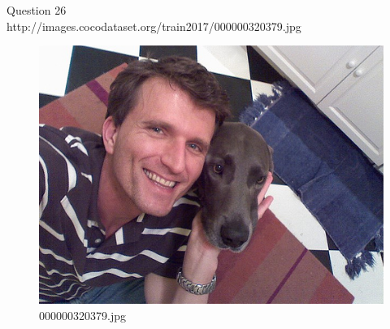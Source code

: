    Question 26 \\
    http://images.cocodataset.org/train2017/000000320379.jpg
    \begin{figure}[h]
        \centering
        \includegraphics[width=0.8\linewidth]{../image set/easy/000000320379.jpg}
        \caption{000000320379.jpg}
    \end{figure}
